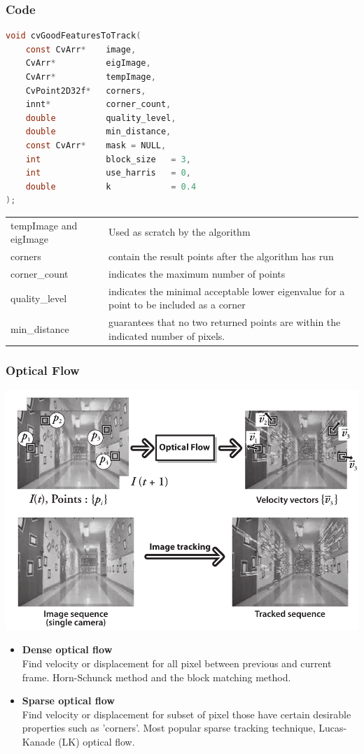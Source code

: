 \documentclass[usenames,dvipsnames]{beamer}
\begin{document}
\begin{frame}[fragile]
\frametitle{Code}
\begin{lstlisting}[language=c]
void cvGoodFeaturesToTrack(
	const CvArr*  	image,
	CvArr*        	eigImage,
	CvArr*          tempImage,
	CvPoint2D32f*   corners,
	innt*           corner_count,
	double          quality_level,
	double          min_distance,
	const CvArr*    mask = NULL,
	int             block_size   = 3,
	int             use_harris   = 0,
	double          k            = 0.4
);
\end{lstlisting}
\vspace{-0.9cm}
\begin{table}
\footnotesize
\begin{tabular}{ll}
tempImage and eigImage & Used as scratch by the algorithm\\
corners & contain the result points after the algorithm has run\\
corner\_count & indicates the maximum number of points\\
quality\_level & indicates the minimal acceptable lower eigenvalue for a point to be included as a corner\\
min\_distance & guarantees that no two returned points are within the indicated number of pixels.
\end{tabular}
\end{table}
\end{frame}
\begin{frame}[allowframebreaks]
\frametitle{Optical Flow}
\includegraphics[scale=.32]{Images/pic_hall.png}
\begin{itemize}
\item \textbf{Dense optical flow}\\
Find velocity or displacement for all pixel between previous and current frame. Horn-Schunck method and the block matching method.
\item \textbf{Sparse optical flow}\\
Find velocity or displacement for subset of pixel those have certain desirable properties such as 'corners'. Most popular sparse tracking technique, Lucas-Kanade (LK) optical flow.
\end{itemize}
\end{frame}
\end{document}
